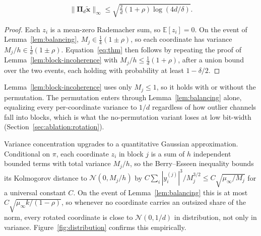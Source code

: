 \begin{equation}
\|\boldsymbol{\Pi}_d \tilde{\mathbf{x}}\|_\infty \le \sqrt{\tfrac{2}{d}(1 + \rho)\log(4d/\delta)}.
\label{eq:thm}
\end{equation}
\begin{proof}
Each $z_i$ is a mean-zero Rademacher sum, so $\mathbb{E}[z_i] = 0$. On the event of Lemma~\ref{lem:balancing}, $M_j \in \tfrac{1}{k}(1 \pm \rho)$, so each coordinate has variance $M_j/h \in \tfrac{1}{d}(1 \pm \rho)$. Equation~\eqref{eq:thm} then follows by repeating the proof of Lemma~\ref{lem:block-incoherence} with $M_j/h \le \tfrac{1}{d}(1 + \rho)$, after a union bound over the two events, each holding with probability at least $1 - \delta/2$.
\end{proof}
\begin{remark}
Lemma~\ref{lem:block-incoherence} uses only $M_j \le 1$, so it holds with or without the permutation. The permutation enters through Lemma~\ref{lem:balancing} alone, equalizing every per-coordinate variance to $1/d$ regardless of how outlier channels fall into blocks, which is what the no-permutation variant loses at low bit-width (Section~\ref{sec:ablation:rotation}).
\end{remark}

\begin{remark}
Variance concentration upgrades to a quantitative Gaussian approximation. Conditional on $\pi$, each coordinate $z_i$ in block $j$ is a sum of $h$ independent bounded terms with total variance $M_j/h$, so the Berry--Esseen inequality bounds its Kolmogorov distance to $\mathcal{N}(0, M_j/h)$ by $C \sum_i |y^{(j)}_i|^3 / M_j^{3/2} \le C\sqrt{\mu_\infty / M_j}$ for a universal constant $C$. On the event of Lemma~\ref{lem:balancing} this is at most $C\sqrt{\mu_\infty k/(1-\rho)}$, so whenever no coordinate carries an outsized share of the norm, every rotated coordinate is close to $\mathcal{N}(0, 1/d)$ in distribution, not only in variance. Figure~\ref{fig:distribution} confirms this empirically.
\end{remark}



